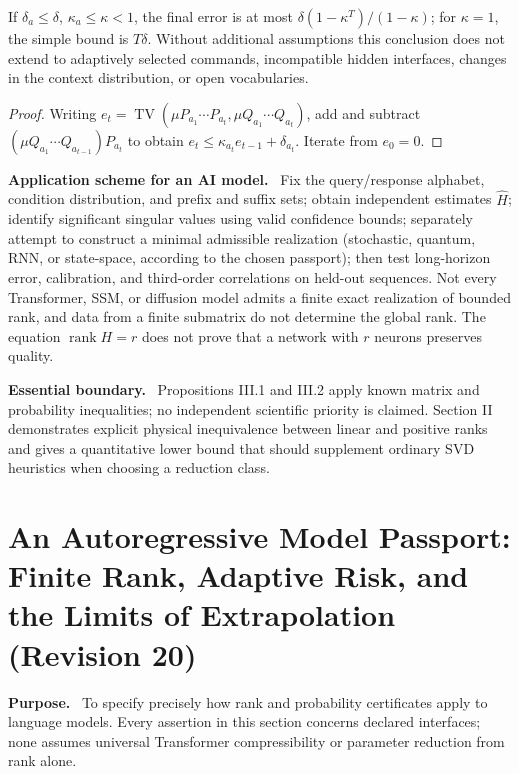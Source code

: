 \documentclass[11pt,a4paper,oneside]{book}
\DeclareMathOperator{\rank}{rank}\DeclareMathOperator{\Tr}{Tr}
\newcommand{\note}[1]{\par\medskip\noindent\textbf{#1}\ }
\begin{document}
If $\delta_a\le\delta$, $\kappa_a\le\kappa<1$, the final error is at most $\delta(1-\kappa^T)/(1-\kappa)$; for $\kappa=1$, the simple bound is $T\delta$. Without additional assumptions this conclusion does not extend to adaptively selected commands, incompatible hidden interfaces, changes in the context distribution, or open vocabularies.
\begin{proof}Writing $e_t=\operatorname{TV}(\mu P_{a_1}\cdots P_{a_t},\mu Q_{a_1}\cdots Q_{a_t})$, add and subtract $(\mu Q_{a_1}\cdots Q_{a_{t-1}})P_{a_t}$ to obtain $e_t\le\kappa_{a_t}e_{t-1}+\delta_{a_t}$. Iterate from $e_0=0$.\end{proof}
\note{Application scheme for an AI model.} Fix the query/response alphabet, condition distribution, and prefix and suffix sets; obtain independent estimates $\widehat H$; identify significant singular values using valid confidence bounds; separately attempt to construct a minimal admissible realization (stochastic, quantum, RNN, or state-space, according to the chosen passport); then test long-horizon error, calibration, and third-order correlations on held-out sequences. Not every Transformer, SSM, or diffusion model admits a finite exact realization of bounded rank, and data from a finite submatrix do not determine the global rank. The equation $\rank H=r$ does not prove that a network with $r$ neurons preserves quality.
\note{Essential boundary.} Propositions III.1 and III.2 apply known matrix and probability inequalities; no independent scientific priority is claimed. Section II demonstrates explicit physical inequivalence between linear and positive ranks and gives a quantitative lower bound that should supplement ordinary SVD heuristics when choosing a reduction class.
\chapter{An Autoregressive Model Passport: Finite Rank, Adaptive Risk, and the Limits of Extrapolation (Revision 20)}
\note{Purpose.} To specify precisely how rank and probability certificates apply to language models. Every assertion in this section concerns declared interfaces; none assumes universal Transformer compressibility or parameter reduction from rank alone.
\end{document}
